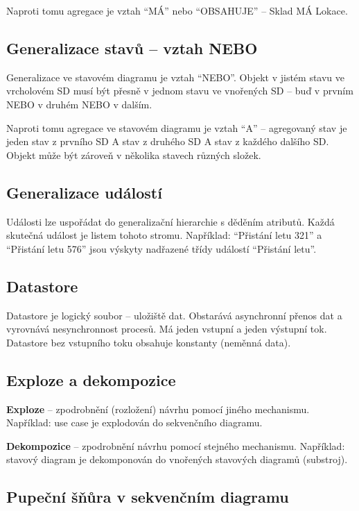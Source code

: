 \documentclass[12pt, a4paper]{article}
\begin{document}
Naproti tomu agregace je vztah ``MÁ'' nebo ``OBSAHUJE'' -- Sklad MÁ Lokace.

\subsection{Generalizace stavů -- vztah NEBO}

Generalizace ve stavovém diagramu je vztah ``NEBO''. Objekt v jistém stavu ve vrcholovém SD musí být přesně v jednom stavu ve vnořených SD -- buď v prvním NEBO v druhém NEBO v dalším.

Naproti tomu agregace ve stavovém diagramu je vztah ``A'' -- agregovaný stav je jeden stav z prvního SD A stav z druhého SD A stav z každého dalšího SD. Objekt může být zároveň v několika stavech různých složek.

\subsection{Generalizace událostí}

Události lze uspořádat do generalizační hierarchie s děděním atributů. Každá skutečná událost je listem tohoto stromu. Například: ``Přistání letu 321'' a ``Přistání letu 576'' jsou výskyty nadřazené třídy událostí ``Přistání letu''.

\subsection{Datastore}

Datastore je logický soubor -- uložiště dat. Obstarává asynchronní přenos dat a vyrovnává nesynchronnost procesů. Má jeden vstupní a jeden výstupní tok. Datastore bez vstupního toku obsahuje konstanty (neměnná data).

\subsection{Exploze a dekompozice}

\textbf{Exploze} -- zpodrobnění (rozložení) návrhu pomocí jiného mechanismu. Například: use case je explodován do sekvenčního diagramu.

\textbf{Dekompozice} -- zpodrobnění návrhu pomocí stejného mechanismu. Například: stavový diagram je dekomponován do vnořených stavových diagramů (substroj).

\subsection{Pupeční šňůra v sekvenčním diagramu}
\end{document}
